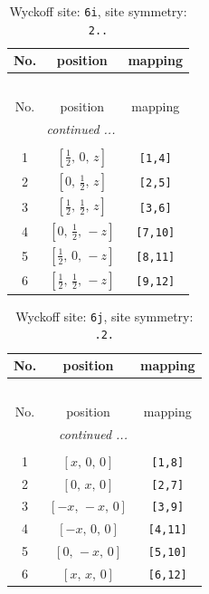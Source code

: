 \documentclass[fleqn,8pt]{jsarticle}
\begin{document}
\renewcommand{\arraystretch}{1.2}
\begin{longtable}{ccc}
\caption{Wyckoff site: {\tt 6i}, site symmetry: {\tt 2..}}
 \\
 \hline \hline
No. & position & mapping \\ \hline \endfirsthead

\multicolumn{2}{l}{\tablename\ \thetable{}} \\
 \hline \hline
No. & position & mapping \\ \hline \endhead

 \hline \hline
\multicolumn{2}{r}{\footnotesize\it continued ...} \\ \endfoot

 \hline \hline
\multicolumn{2}{r}{} \\ \endlastfoot

1 & $\left[ \frac{1}{2},\, 0,\, z \right]$ & {\tt [1,4]} \\ \hline
2 & $\left[ 0,\, \frac{1}{2},\, z \right]$ & {\tt [2,5]} \\ \hline
3 & $\left[ \frac{1}{2},\, \frac{1}{2},\, z \right]$ & {\tt [3,6]} \\ \hline
4 & $\left[ 0,\, \frac{1}{2},\, - z \right]$ & {\tt [7,10]} \\ \hline
5 & $\left[ \frac{1}{2},\, 0,\, - z \right]$ & {\tt [8,11]} \\ \hline
6 & $\left[ \frac{1}{2},\, \frac{1}{2},\, - z \right]$ & {\tt [9,12]} \\
\end{longtable}
\renewcommand{\arraystretch}{1.2}
\begin{longtable}{ccc}
\caption{Wyckoff site: {\tt 6j}, site symmetry: {\tt .2.}}
 \\
 \hline \hline
No. & position & mapping \\ \hline \endfirsthead

\multicolumn{2}{l}{\tablename\ \thetable{}} \\
 \hline \hline
No. & position & mapping \\ \hline \endhead

 \hline \hline
\multicolumn{2}{r}{\footnotesize\it continued ...} \\ \endfoot

 \hline \hline
\multicolumn{2}{r}{} \\ \endlastfoot

1 & $\left[ x,\, 0,\, 0 \right]$ & {\tt [1,8]} \\ \hline
2 & $\left[ 0,\, x,\, 0 \right]$ & {\tt [2,7]} \\ \hline
3 & $\left[ - x,\, - x,\, 0 \right]$ & {\tt [3,9]} \\ \hline
4 & $\left[ - x,\, 0,\, 0 \right]$ & {\tt [4,11]} \\ \hline
5 & $\left[ 0,\, - x,\, 0 \right]$ & {\tt [5,10]} \\ \hline
6 & $\left[ x,\, x,\, 0 \right]$ & {\tt [6,12]} \\
\end{longtable}
\end{document}
